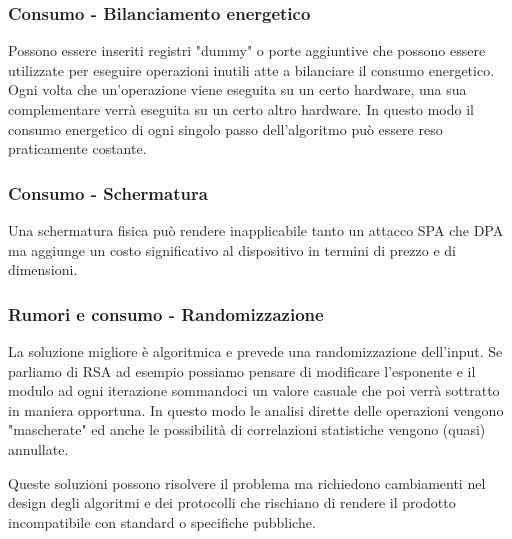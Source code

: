 		\subsubsection*{Consumo - Bilanciamento energetico}
			Possono essere inseriti registri "dummy" o porte aggiuntive che possono essere utilizzate per eseguire operazioni inutili atte a bilanciare il consumo energetico. Ogni volta che un'operazione viene eseguita su un certo hardware, una sua complementare verrà eseguita su un certo altro hardware. In questo modo il consumo energetico di ogni singolo passo dell'algoritmo può essere reso praticamente costante.
			
		\subsubsection*{Consumo - Schermatura}
			Una schermatura fisica può rendere inapplicabile tanto un attacco \ac{SPA} che \ac{DPA} ma aggiunge un costo significativo al dispositivo in termini di prezzo e di dimensioni.			
		
		\subsubsection*{Rumori e consumo - Randomizzazione}		
			La soluzione migliore è algoritmica e prevede una randomizzazione dell'input. Se parliamo di RSA ad esempio possiamo pensare di modificare l'esponente e il modulo ad ogni iterazione sommandoci un valore casuale che poi verrà sottratto in maniera opportuna. In questo modo le analisi dirette delle operazioni vengono "mascherate" ed anche le possibilità di correlazioni statistiche vengono (quasi) annullate.
			
			Queste soluzioni possono risolvere il problema ma richiedono cambiamenti nel design degli algoritmi e dei protocolli che rischiano di rendere il prodotto incompatibile con standard o specifiche pubbliche.